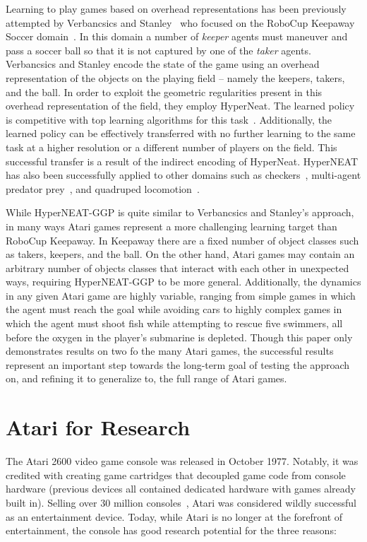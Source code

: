 \documentclass{acm_proc_article-sp}
\begin{document}
Learning to play games based on overhead representations has been previously attempted by Verbancsics and Stanley~\cite{verbancsics10} who focused on the RoboCup Keepaway Soccer domain~\cite{stone01}. In this domain a number of \textit{keeper} agents must maneuver and pass a soccer ball so that it is not captured by one of the \textit{taker} agents. Verbancsics and Stanley encode the state of the game using an overhead representation of the objects on the playing field -- namely the keepers, takers, and the ball. In order to exploit the geometric regularities present in this overhead representation of the field, they employ HyperNeat. The learned policy is competitive with top learning algorithms for this task~\cite{stone05}. Additionally, the learned policy can be effectively transferred with no further learning to the same task at a higher resolution or a different number of players on the field. This successful transfer is a result of the indirect encoding of HyperNeat. HyperNEAT has also been successfully applied to other domains such as checkers~\cite{gauci08}, multi-agent predator prey~\cite{ambrosio08}, and quadruped locomotion~\cite{clune09}. 

While HyperNEAT-GGP is quite similar to Verbancsics and Stanley's approach, in many ways Atari games represent a more challenging learning target than RoboCup Keepaway. In Keepaway there are a fixed number of object classes such as takers, keepers, and the ball. On the other hand, Atari games may contain an arbitrary number of objects classes that interact with each other in unexpected ways, requiring HyperNEAT-GGP to be more general. Additionally, the dynamics in any given Atari game are highly variable, ranging from simple games in which the agent must reach the goal while avoiding cars to highly complex games in which the agent must shoot fish while attempting to rescue five swimmers, all before the oxygen in the player's submarine is depleted. Though this paper only demonstrates results on two fo the many Atari games, the successful results represent an important step towards the long-term goal of testing the approach on, and refining it to generalize to, the full range of Atari games.

\section{Atari for Research}
\label{sec:atari}
The Atari 2600 video game console was released in October 1977. Notably, it was credited with creating game cartridges that decoupled game code from console hardware (previous devices all contained dedicated hardware with games already built in). Selling over 30 million consoles~\cite{atarihist}, Atari was considered wildly successful as an entertainment device. Today, while Atari is no longer at the forefront of entertainment, the console has good research potential for the three reasons:
\end{document}
